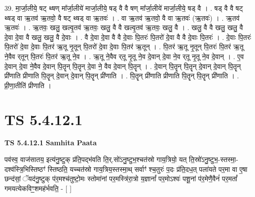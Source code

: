 \documentclass[17pt]{extarticle}
\begin{document}
39. मा॒र्जा॒लीये॒ षट् थ्षण् मा᳚र्जा॒लीये॑ मार्जा॒लीये॒ षड् वै वै षण् मा᳚र्जा॒लीये॑ मार्जा॒लीये॒ षड् वै । . षड् वै वै षट् थ्षड् वा ऋ॒तव॑ ऋ॒तवो॒ वै षट् थ्षड् वा ऋ॒तवः॑ । . वा ऋ॒तव॑ ऋ॒तवो॒ वै वा ऋ॒तवः॑ (ऋ॒तवः॑)  । . ऋ॒तव॑ ऋ॒तवः॑ । . ऋ॒तवः॒ खलु॒ खल्वृ॒तव॑ ऋ॒तवः॒ खलु॒ वै वै खल्वृ॒तव॑ ऋ॒तवः॒ खलु॒ वै । . खलु॒ वै वै खलु॒ खलु॒ वै दे॒वा दे॒वा वै खलु॒ खलु॒ वै दे॒वाः । . वै दे॒वा दे॒वा वै वै दे॒वाः पि॒तरः॑ पि॒तरो॑ दे॒वा वै वै दे॒वाः पि॒तरः॑ । . दे॒वाः पि॒तरः॑ पि॒तरो॑ दे॒वा दे॒वाः पि॒तर॑ ऋ॒तू नृ॒तून् पि॒तरो॑ दे॒वा दे॒वाः पि॒तर॑ ऋ॒तून् । . पि॒तर॑ ऋ॒तू नृ॒तून् पि॒तरः॑ पि॒तर॑ ऋ॒तू ने॒वैव र्‌तून् पि॒तरः॑ पि॒तर॑ ऋ॒तू ने॒व । . ऋ॒तू ने॒वैव र्‌तू नृ॒तू ने॒व दे॒वान् दे॒वा ने॒व र्‌तू नृ॒तू ने॒व दे॒वान् । . ए॒व दे॒वान् दे॒वा ने॒वैव दे॒वान् पि॒तॄन् पि॒तॄन् दे॒वा ने॒ वैव दे॒वान् पि॒तॄन् । . दे॒वान् पि॒तॄन् पि॒तॄन् दे॒वान् दे॒वान् पि॒तॄन् प्री॑णाति प्रीणाति पि॒तॄन् दे॒वान् दे॒वान् पि॒तॄन् प्री॑णाति । . पि॒तॄन् प्री॑णाति प्रीणाति पि॒तॄन् पि॒तॄन् प्री॑णाति । . प्री॒णा॒तीति॑ प्रीणाति । \newline
\pagebreak
{}

\section{ TS 5.4.12.1 }

\textbf{TS 5.4.12.1 } \newline
\textbf{Samhita Paata} \newline

पव॑स्व॒ वाज॑सातय॒ इत्य॑नु॒ष्टुक् प्र॑ति॒पद्भ॑वति ति॒र्.सो॑ऽनु॒ष्टुभ॒श्चत॑स्रो गाय॒त्रियो॒ यत् ति॒स्रो॑ऽनु॒ष्टुभ॒-स्तस्मा॒-दश्व॑स्त्रि॒भिस्तिष्ठꣳ॑ स्तिष्ठति॒ यच्चत॑स्रो गाय॒त्रिय॒स्तस्मा॒थ् सर्वाꣳ॑ श्च॒तुरः॑ प॒दः प्र॑ति॒दध॒त् पला॑यते पर॒मा वा ए॒षा छन्द॑सां॒ ॅयद॑नु॒ष्टुक् प॑र॒मश्च॑तुष्टो॒मः स्तोमा॑नां पर॒मस्त्रि॑रा॒त्रो य॒ज्ञानां᳚ पर॒मोऽश्वः॑ पशू॒नां प॑र॒मेणै॒वैनं॑ पर॒मतां᳚ गमयत्येकविꣳ॒॒शमह॑र्भवति॒ - [  ] \newline
\end{document}
